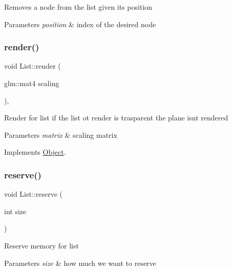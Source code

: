Removes a node from the list given its position 
\begin{DoxyParams}{Parameters}
{\em position} & index of the desired node \\
\hline
\end{DoxyParams}
\mbox{\label{classList_a98b7c18a8ee26e9e521ab3b8f8bb4334}} 
\subsubsection{\texorpdfstring{render()}{render()}}
{\footnotesize\ttfamily void List\+::render (\begin{DoxyParamCaption}\item[{glm\+::mat4}]{scaling }\end{DoxyParamCaption})\hspace{0.3cm}{\ttfamily [override]}, {\ttfamily [virtual]}}

Render for list if the list ot render is trasparent the plane isn\textquotesingle{}t rendered 
\begin{DoxyParams}{Parameters}
{\em matrix} & scaling matrix \\
\hline
\end{DoxyParams}


Implements \hyperlink{classObject_af7b5e6c789269f331688537c0809fb82}{Object}.

\mbox{\label{classList_ab0fd82314008a2da13ae096b3794def8}} 
\subsubsection{\texorpdfstring{reserve()}{reserve()}}
{\footnotesize\ttfamily void List\+::reserve (\begin{DoxyParamCaption}\item[{int}]{size }\end{DoxyParamCaption})}

Reserve memory for list 
\begin{DoxyParams}{Parameters}
{\em size} & how much we want to reserve \\
\hline
\end{DoxyParams}
\mbox{\label{classList_ad37b253f0232820b8c13a1523e9f46b6}} 
